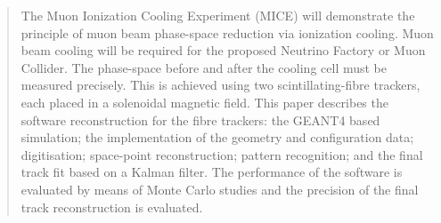 \begin{quotation}

\noindent
The Muon Ionization Cooling Experiment (MICE) will demonstrate the principle of muon beam phase-space reduction via ionization cooling.  Muon beam cooling will be required for the proposed Neutrino Factory or Muon Collider.  The phase-space before and after the cooling cell must be measured precisely. This is achieved using two scintillating-fibre trackers, each placed in a solenoidal magnetic field.  This paper describes the software reconstruction for the fibre trackers: the GEANT4 based simulation; the implementation of the geometry and configuration data; digitisation; space-point reconstruction; pattern recognition; and the final track fit based on a Kalman filter. The performance of the software is evaluated by means of Monte Carlo studies and the precision of the final track reconstruction is evaluated.

\end{quotation}
